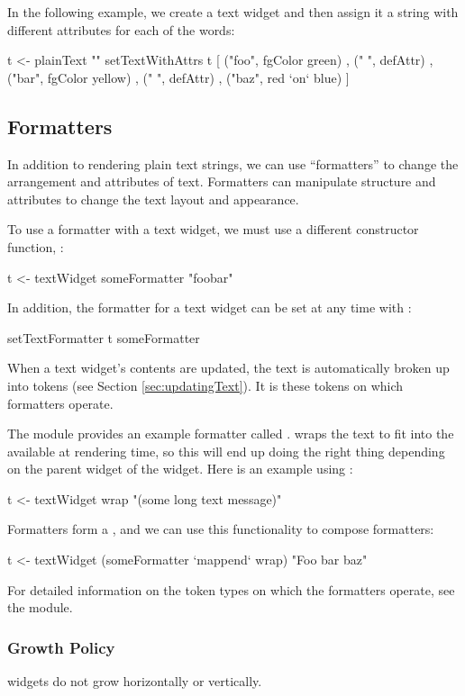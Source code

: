 In the following example, we create a text widget and then assign it a
string with different attributes for each of the words:

\begin{haskellcode}
 t <- plainText ""
 setTextWithAttrs t [ ("foo", fgColor green)
                    , (" ", defAttr)
                    , ("bar", fgColor yellow)
                    , (" ", defAttr)
                    , ("baz", red `on` blue)
                    ]
\end{haskellcode}

\subsection{Formatters}

In addition to rendering plain text strings, we can use ``formatters''
to change the arrangement and attributes of text.  Formatters can
manipulate structure and attributes to change the text layout and
appearance.

To use a formatter with a text widget, we must use a different
constructor function, :

\begin{haskellcode}
 t <- textWidget someFormatter "foobar"
\end{haskellcode}

In addition, the formatter for a text widget can be set at any time
with :

\begin{haskellcode}
 setTextFormatter t someFormatter
\end{haskellcode}

When a text widget's contents are updated, the text is automatically
broken up into tokens (see Section \ref{sec:updatingText}).  It is
these tokens on which formatters operate.

The  module provides an example formatter called .
 wraps the text to fit into the  available
at rendering time, so this will end up doing the right thing depending
on the parent widget of the  widget.  Here is an
example using :

\begin{haskellcode}
 t <- textWidget wrap "(some long text message)"
\end{haskellcode}

Formatters form a , and we can use this functionality to
compose formatters:

\begin{haskellcode}
 t <- textWidget (someFormatter `mappend` wrap) "Foo bar baz"
\end{haskellcode}

For detailed information on the token types on which the formatters
operate, see the  module.

\subsubsection{Growth Policy}

 widgets do not grow horizontally or vertically.
